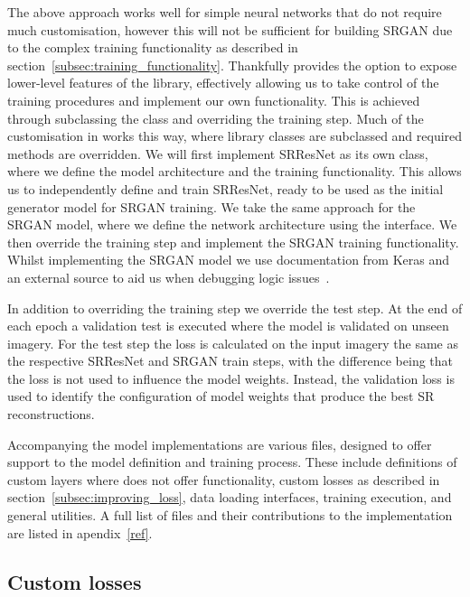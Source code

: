 The above approach works well for simple neural networks that do not require much customisation, however this will not be sufficient for building SRGAN due to the complex training functionality as described in section~\ref{subsec:training_functionality}. Thankfully  provides the option to expose lower-level features of the library, effectively allowing us to take control of the training procedures and implement our own functionality. This is achieved through subclassing the  class and overriding the training step. Much of the customisation in  works this way, where library classes are subclassed and required methods are overridden. We will first implement SRResNet as its own class, where we define the model architecture and the training functionality. This allows us to independently define and train SRResNet, ready to be used as the initial generator model for SRGAN training. We take the same approach for the SRGAN model, where we define the network architecture using the  interface. We then override the training step and implement the SRGAN training functionality. Whilst implementing the SRGAN model we use documentation from Keras and an external source to aid us when debugging logic issues~\cite{keras, srganImplementation}.

In addition to overriding the training step we override the test step. At the end of each epoch a validation test is executed where the model is validated on unseen imagery. For the test step the loss is calculated on the input imagery the same as the respective SRResNet and SRGAN train steps, with the difference being that the loss is not used to influence the model weights. Instead, the validation loss is used to identify the configuration of model weights that produce the best SR reconstructions.

Accompanying the model implementations are various  files, designed to offer support to the model definition and training process. These include definitions of custom layers where  does not offer functionality, custom losses as described in section~\ref{subsec:improving_loss}, data loading interfaces, training execution, and general utilities. A full list of  files and their contributions to the implementation are listed in apendix~\ref{ref}.

\subsection{Custom losses}

